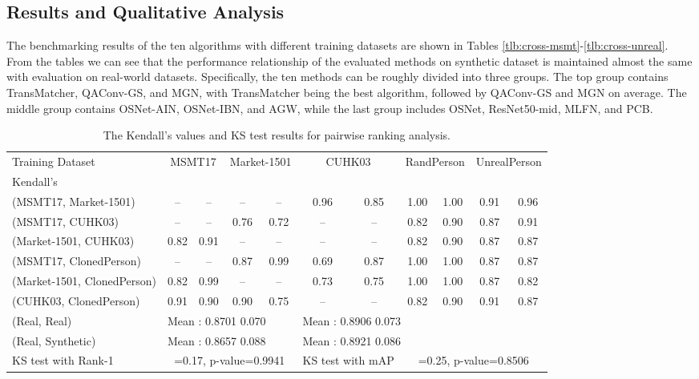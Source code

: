 \documentclass[10pt,twocolumn,letterpaper]{article}
\begin{document}
\subsection{Results and Qualitative Analysis}

The benchmarking results of the ten algorithms with different training datasets are shown in Tables \ref{tlb:cross-msmt}-\ref{tlb:cross-unreal}.
From the tables we can see that the performance relationship of the evaluated methods on synthetic dataset is maintained almost the same with evaluation on real-world datasets. Specifically, the ten methods can be roughly divided into three groups. The top group contains TransMatcher, QAConv-GS, and MGN, with TransMatcher being the best algorithm, followed by QAConv-GS and MGN on average. The middle group contains OSNet-AIN, OSNet-IBN, and AGW, while the last group includes OSNet, ResNet50-mid, MLFN, and PCB.



\begin{table*}
\centering
\begin{tabular}{|l@{}|c c|c c|c c|c c|c c|}
\hline
Training Dataset& \multicolumn{2}{c|}{MSMT17} & \multicolumn{2}{c|}{Market-1501}& \multicolumn{2}{c|}{CUHK03}& \multicolumn{2}{c|}{RandPerson}& \multicolumn{2}{c|}{UnrealPerson} \\ 

Kendall's  &  & &  & &  & &  & &  &  \\ \hline
(MSMT17, Market-1501)   & -- & -- & -- & -- & 0.96 & 0.85 & 1.00 & 1.00 & 0.91 & 0.96 \\
(MSMT17, CUHK03)       & -- & -- & 0.76 & 0.72 & -- & -- & 0.82 & 0.90 & 0.87 & 0.91 \\ 
(Market-1501, CUHK03)   & 0.82 & 0.91 & -- & -- & -- & -- & 0.82 & 0.90 & 0.87 & 0.87 \\ \hline
(MSMT17, ClonedPerson) & -- & -- & 0.87 & 0.99 & 0.69 & 0.87 & 1.00 & 1.00& 0.87 & 0.87 \\ 
(Market-1501, ClonedPerson)    & 0.82 & 0.99 & -- & -- & 0.73 & 0.75 & 1.00 & 1.00 & 0.87 & 0.82 \\ 
(CUHK03, ClonedPerson)        & 0.91 & 0.90 & 0.90 & 0.75 & -- & -- & 0.82 & 0.90 & 0.91 & 0.87 \\ 
\hline\hline
(Real, Real)         & \multicolumn{4}{l}{Mean : 0.8701  0.070 } & \multicolumn{6}{|l|}{Mean : 0.8906  0.073}  \\   
(Real, Synthetic)    & \multicolumn{4}{l}{Mean : 0.8657  0.088 } & \multicolumn{6}{|l|}{Mean : 0.8921  0.086}   \\  \hline 
KS test with Rank-1   & \multicolumn{4}{c}{=0.17, p-value=0.9941} & \multicolumn{2}{|c}{KS test with mAP} & \multicolumn{4}{|c|}{=0.25, p-value=0.8506 }    \\  \hline
\end{tabular}
\caption{The Kendall's  values and KS test results for pairwise ranking analysis.}
\label{tlb:kenl-5task}
\end{table*}
\end{document}
